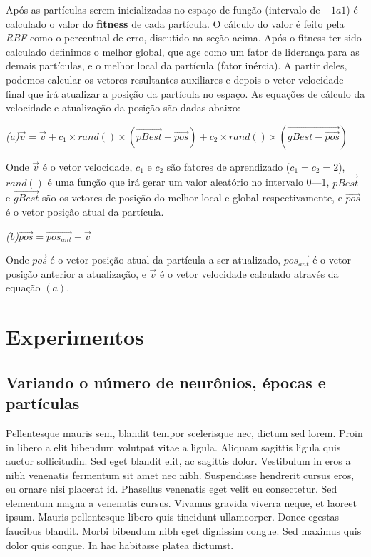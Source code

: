 \documentclass[10pt,twocolumn,letterpaper]{article}
\begin{document}
Após as partículas serem inicializadas no espaço de função (intervalo de $-1 a 1$) é calculado o valor do \textbf{fitness} de cada partícula. O cálculo do valor é feito pela \textit{RBF} como o percentual de erro, discutido na seção acima.
Após o fitness ter sido calculado definimos o melhor global, que age como um fator de liderança para as demais partículas, e o melhor local da partícula (fator inércia). A partir deles, podemos calcular os vetores resultantes auxiliares e depois o vetor velocidade final que irá atualizar a posição da partícula no espaço. As equações de cálculo da velocidade e atualização da posição são dadas abaixo:

\begin{center}
\textit{(a)}\qquad$\vec{v} = \vec{v} + c_1 \times rand() \times (\vec{pBest} - \vec{pos}) + c_2 \times rand() \times (\vec{gBest - \vec{pos}})$ 
\end{center}

Onde $\vec{v}$ é o vetor velocidade, $c_1$ e $c_2$ são fatores de aprendizado ($c_1 = c_2 = 2$), $rand()$ é uma função que irá gerar um valor aleatório no intervalo 0---1, $\vec{pBest}$ e $\vec{gBest}$ são os vetores de posição do melhor local e global respectivamente, e $\vec{pos}$ é o vetor posição atual da partícula. 

\begin{center}
\textit{(b)}\qquad$\vec{pos} = \vec{pos_{ant}} + \vec{v}$ 
\end{center}
Onde $\vec{pos}$ é o vetor posição atual da partícula a ser atualizado, $\vec{pos_{ant}}$ é o vetor posição anterior a atualização, e $\vec{v}$ é o vetor velocidade calculado através da equação $(a)$.

\section{Experimentos}

\subsection{Variando o número de neurônios, épocas e partículas}
Pellentesque mauris sem, blandit tempor scelerisque nec, dictum sed lorem. Proin in libero a elit bibendum volutpat vitae a ligula. Aliquam sagittis ligula quis auctor sollicitudin. Sed eget blandit elit, ac sagittis dolor. Vestibulum in eros a nibh venenatis fermentum sit amet nec nibh. Suspendisse hendrerit cursus eros, eu ornare nisi placerat id. Phasellus venenatis eget velit eu consectetur. Sed elementum magna a venenatis cursus. Vivamus gravida viverra neque, et laoreet ipsum. Mauris pellentesque libero quis tincidunt ullamcorper. Donec egestas faucibus blandit. Morbi bibendum nibh eget dignissim congue. Sed maximus quis dolor quis congue. In hac habitasse platea dictumst.
\end{document}
